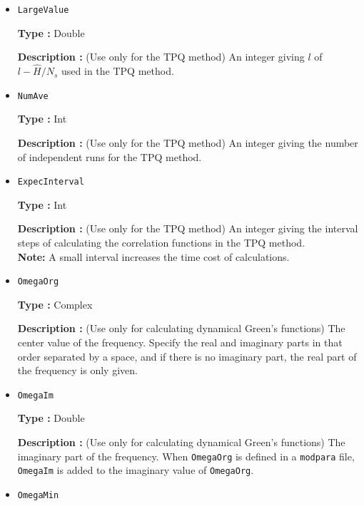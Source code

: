 \begin{itemize}
 {\bf Type :} Int (positive integer)

  {\bf Description :} If CalcHS=1, an efficient algorithm for generating the restricted Hilbert space with the specified
quantum number is used (Details of algorithm is shown in http://qlms.github.io/HPhi/develop/tips.pdf[in Japanese]). 
Default value is 1 and the efficient algorithm is used.
     


\item \verb|LargeValue|

{\bf Type :} Double

{\bf Description :} (Use only for the TPQ method) An integer giving $l$ of $l-\hat{H}/N_{s}$ used in the TPQ method.
 
\item \verb|NumAve|

{\bf Type :} Int

{\bf Description :} (Use only for the TPQ method) An integer giving the number of independent runs for the TPQ method. 

\item \verb|ExpecInterval|

{\bf Type :} Int

{\bf Description :} (Use only for the TPQ method) An integer giving the interval steps of calculating the correlation functions in the TPQ method.\\ 
{\bf Note:} A small interval increases the time cost of calculations.
 
 \item \verb|OmegaOrg|

{\bf Type :} Complex

{\bf Description :} {(Use only for calculating dynamical Green's functions) 
The center value of the frequency. 
Specify the real and imaginary parts in that order separated by a space, 
and if there is no imaginary part, the real part of the frequency is only given.}

\item \verb|OmegaIm|

    {\bf Type :} Double
    
    {\bf Description :} (Use only for calculating dynamical Green's functions) 
    The imaginary part of the frequency. 
    When \verb|OmegaOrg| is defined in a \verb|modpara| file, \verb|OmegaIm| is added to the imaginary value of \verb|OmegaOrg|.

\item \verb|OmegaMin|


\end{itemize}

